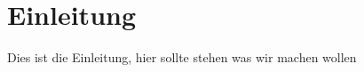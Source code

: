 \section{Einleitung}\label{sec:einleitung}
Dies ist die Einleitung, hier sollte stehen was wir machen wollen